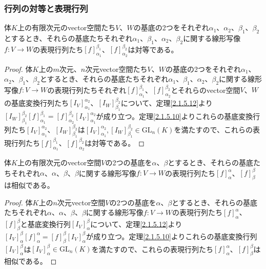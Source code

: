 \documentclass[dvipdfmx]{jsarticle}
\begin{document}
\subsubsection{行列の対等と表現行列}%
\begin{thm}\label{2.1.6.3}
体$K$上の有限次元のvector空間たち$V$、$W$の基底の2つをそれぞれ$\alpha_{1}$、$\alpha_{2}$、$\beta_{1}$、$\beta_{2}$とするとき、それらの基底たちそれぞれ$\alpha_{1}$、$\beta_{1}$、$\alpha_{2}$、$\beta_{2}$に関する線形写像$f:V \rightarrow W$の表現行列たち$[ f]^{\beta_{1}}_{\alpha_{1}}$、$[ f]^{\beta_{2}}_{\alpha_{2}}$は対等である。
\end{thm}
\begin{proof}
体$K$上の$m$次元、$n$次元vector空間たち$V$、$W$の基底の2つをそれぞれ$\alpha_{1}$、$\alpha_{2}$、$\beta_{1}$、$\beta_{2}$とするとき、それらの基底たちそれぞれ$\alpha_{1}$、$\beta_{1}$、$\alpha_{2}$、$\beta_{2}$に関する線形写像$f:V \rightarrow W$の表現行列たちそれぞれ$[ f]^{\beta_{1}}_{\alpha_{1}}$、$[ f]^{\beta_{2}}_{\alpha_{2}}$とそれらのvector空間$V$、$W$の基底変換行列たち$\left[ I_{V} \right]^{\alpha_{2}}_{\alpha_{1}}$、$\left[ I_{W} \right]^{\beta_{2}}_{\beta_{1}}$について、定理\ref{2.1.5.12}より$\left[ I_{W} \right]^{\beta_{2}}_{\beta_{1}}[ f]^{\beta_{1}}_{\alpha_{1}} = [ f]^{\beta_{2}}_{\alpha_{2}}\left[ I_{V} \right]^{\alpha_{2}}_{\alpha_{1}}$が成り立つ。定理\ref{2.1.5.10}よりこれらの基底変換行列たち$\left[ I_{V} \right]^{\alpha_{2}}_{\alpha_{1}}$、$\left[ I_{W} \right]^{\beta_{2}}_{\beta_{1}}$は$\left[ I_{V} \right]^{\alpha_{2}}_{\alpha_{1}},\left[ I_{W} \right]^{\beta_{2}}_{\beta_{1}} \in {\mathrm{GL}}_{n}(K)$を満たすので、これらの表現行列たち$[ f]^{\beta_{1}}_{\alpha_{1}}$、$[ f]^{\beta_{2}}_{\alpha_{2}}$は対等である。
\end{proof}
\begin{thm}\label{2.1.6.4}
体$K$上の有限次元のvector空間$V$の2つの基底を$\alpha$、$\beta$とするとき、それらの基底たちそれぞれ$\alpha$、$\alpha$、$\beta$、$\beta$に関する線形写像$f:V \rightarrow W$の表現行列たち$[ f]^{\alpha}_{\alpha}$、$[ f]^{\beta}_{\beta}$は相似である。
\end{thm}
\begin{proof}
体$K$上の$n$次元vector空間$V$の2つの基底を$\alpha$、$\beta$とするとき、それらの基底たちそれぞれ$\alpha$、$\alpha$、$\beta$、$\beta$に関する線形写像$f:V \rightarrow W$の表現行列たち$[ f]_{\alpha}^{\alpha}$、$[ f]_{\beta}^{\beta}$と基底変換行列$\left[ I_{V} \right]^{\beta}_{\alpha}$について、定理\ref{2.1.5.12}より$\left[ I_{V} \right]^{\beta}_{\alpha}[ f]_{\alpha}^{\alpha} = [ f]_{\beta}^{\beta}\left[ I_{V} \right]^{\beta}_{\alpha}$が成り立つ。定理\ref{2.1.5.10}よりこれらの基底変換行列$\left[ I_{V} \right]^{\beta}_{\alpha}$は$\left[ I_{V} \right]^{\beta}_{\alpha} \in {\mathrm{GL}}_{n}(K)$を満たすので、これらの表現行列たち$[ f]_{\alpha}^{\alpha}$、$[ f]_{\beta}^{\beta}$は相似である。
\end{proof}
\end{document}
